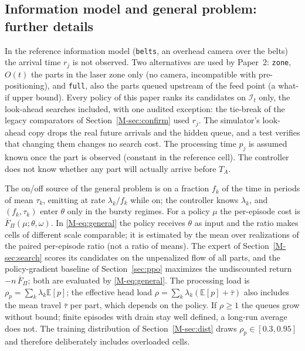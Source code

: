 \documentclass[11pt,a4paper]{article}
\theoremstyle{plain}
\theoremstyle{definition}
\theoremstyle{remark}
\newcommand{\Fpi}{\overline F_\Pi}
\newcommand{\I}{\mathcal I}
\begin{document}
\subsection{Information model and general problem: further details}
In the reference information model (\texttt{belts}, an overhead camera over the belts)
the arrival time $r_j$ is not observed. Two
alternatives are used by Paper~2: \texttt{zone}, $O(t)$ the parts in the laser zone only
(no camera, incompatible with pre-positioning), and \texttt{full}, also the parts queued
upstream of the feed point (a what-if upper bound). Every policy of this paper ranks its candidates on $\I_t$ only,
the look-ahead searches included, with one audited exception: the tie-break of the
legacy comparators of Section~\ref{M-sec:confirm} used $r_j$. The simulator's
look-ahead copy drops the real future arrivals
and the hidden queue, and a test verifies that changing them changes no search cost. The
processing time $p_j$ is assumed known once the part is observed (constant in the
reference cell). The controller does not know whether any part will actually arrive
before $T_A$.

The on/off source of the general problem is on a fraction $f_k$ of the time in
periods of mean $\tau_k$, emitting at rate $\lambda_k/f_k$ while on; the controller knows
$\lambda_k$, and $(f_k,\tau_k)$ enter $\theta$ only in the bursty regimes. For a policy
$\mu$ the per-episode cost is $\Fpi(\mu;\theta,\omega)$. In \eqref{M-eq:general} the policy
receives $\theta$ as input and the ratio makes cells of different scale comparable; it is
estimated by the mean over realizations of the paired per-episode ratio (not a ratio of
means). The expert of Section~\ref{M-sec:search} scores its candidates on the unpenalized
flow of all parts, and the policy-gradient baseline of Section~\ref{sec:ppo} maximizes the
undiscounted return $-n\,\Fpi$; both are evaluated by \eqref{M-eq:general}. The processing
load is $\rho_p=\sum_k\lambda_k\mathbb E[p]$; the effective head load
$\rho=\sum_k\lambda_k(\mathbb E[p]+\bar\tau)$ also includes the mean travel $\bar\tau$ per
part, which depends on the policy. If $\rho\ge1$ the queues grow without bound; finite
episodes with drain stay well defined, a long-run average does not. The training
distribution of Section~\ref{M-sec:dist} draws $\rho_p\in[0.3,0.95]$ and therefore
deliberately includes overloaded cells.
\end{document}
